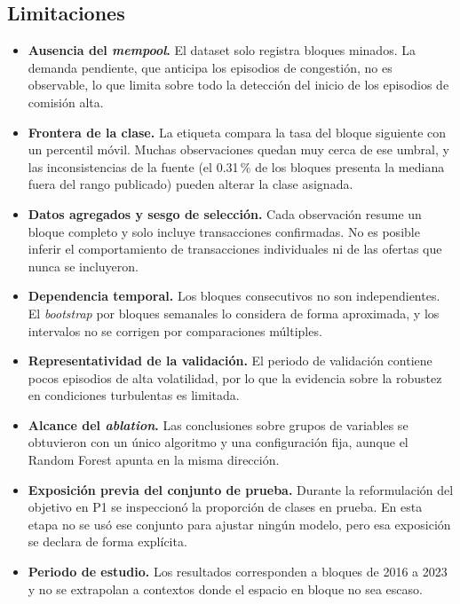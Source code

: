 \subsection{Limitaciones}
\begin{itemize}
\item \textbf{Ausencia del \textit{mempool}.} El dataset solo registra bloques minados. La demanda pendiente, que anticipa los episodios de congestión, no es observable, lo que limita sobre todo la detección del inicio de los episodios de comisión alta.
\item \textbf{Frontera de la clase.} La etiqueta compara la tasa del bloque siguiente con un percentil móvil. Muchas observaciones quedan muy cerca de ese umbral, y las inconsistencias de la fuente (el 0.31\,\% de los bloques presenta la mediana fuera del rango publicado) pueden alterar la clase asignada.
\item \textbf{Datos agregados y sesgo de selección.} Cada observación resume un bloque completo y solo incluye transacciones confirmadas. No es posible inferir el comportamiento de transacciones individuales ni de las ofertas que nunca se incluyeron.
\item \textbf{Dependencia temporal.} Los bloques consecutivos no son independientes. El \textit{bootstrap} por bloques semanales lo considera de forma aproximada, y los intervalos no se corrigen por comparaciones múltiples.
\item \textbf{Representatividad de la validación.} El periodo de validación contiene pocos episodios de alta volatilidad, por lo que la evidencia sobre la robustez en condiciones turbulentas es limitada.
\item \textbf{Alcance del \textit{ablation}.} Las conclusiones sobre grupos de variables se obtuvieron con un único algoritmo y una configuración fija, aunque el Random Forest apunta en la misma dirección.
\item \textbf{Exposición previa del conjunto de prueba.} Durante la reformulación del objetivo en P1 se inspeccionó la proporción de clases en prueba. En esta etapa no se usó ese conjunto para ajustar ningún modelo, pero esa exposición se declara de forma explícita.
\item \textbf{Periodo de estudio.} Los resultados corresponden a bloques de 2016 a 2023 y no se extrapolan a contextos donde el espacio en bloque no sea escaso.
\end{itemize}
